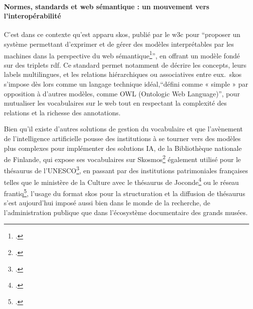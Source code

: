 \paragraph*{Normes, standards et web sémantique : un mouvement vers l’interopérabilité}
C’est dans ce contexte qu'est apparu \gls{skos}, publié par le \ac{w3c} pour \enquote{proposer un système permettant d’exprimer et de gérer des modèles interprétables par les machines dans la perspective du web sémantique\footcite{lenartSKOSLangageRepresentation2007}}, en offrant un modèle fondé sur des triplets \gls{rdf}. Ce standard permet notamment de décrire les concepts, leurs labels multilingues, et les relations hiérarchiques ou associatives entre eux.  \gls{skos} s’impose dès lors comme un langage technique idéal,\enquote{défini comme « simple » par opposition à d’autres modèles, comme OWL (Ontologic Web Language)}, pour mutualiser les vocabulaires sur le web tout en respectant la complexité des relations et la richesse des annotations. 

Bien qu'il existe d'autres solutions de gestion du vocabulaire et que l'avènement de l'intelligence artificielle pousse des institutions à se tourner vers des modèles plus complexes pour implémenter des solutions IA, de la Bibliothèque nationale de Finlande, qui expose ses vocabulaires sur Skosmos\footcite{Skosmos} également utilisé pour le thésaurus de l’UNESCO\footcite{unescoThesaurusLUNESCO1977}, en passant par des institutions patrimoniales françaises telles que le ministère de la Culture avec le thésaurus de Joconde\footcite{ministeredelacultureListeDautoriteDenomination} ou le réseau \ac{frantiq}\footcite{Pactols}, l’usage du format \ac{skos} pour la structuration et la diffusion de thésaurus s’est aujourd’hui imposé aussi bien dans le monde de la recherche, de l’administration publique que dans l’écosystème documentaire des grands musées.

